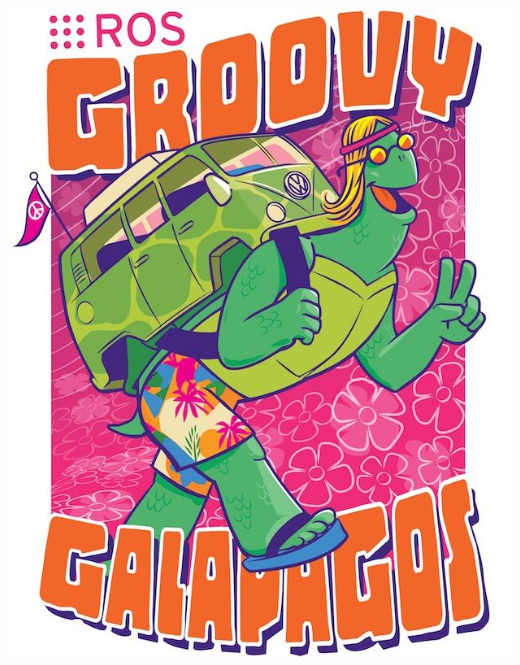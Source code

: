\documentclass[11pt,a4paper]{article}
\begin{document}
\begin{center}
 \includegraphics[scale=2]{EV1/7.jpg}
 \end{center} 
\end{document}
